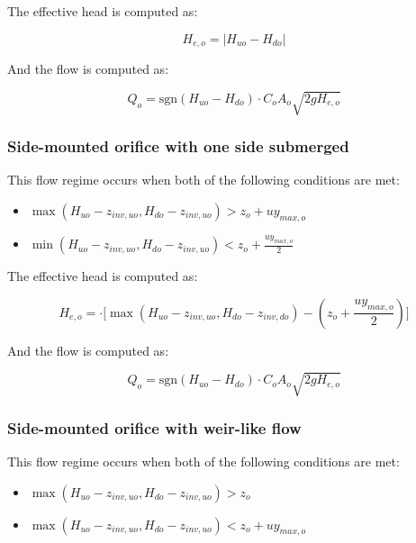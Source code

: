 \documentclass[11pt]{article}
\begin{document}
The effective head is computed as:

\begin{equation}
  H_{e,o} = | H_{uo} - H_{do} |
\end{equation}

And the flow is computed as:

\begin{equation}
 Q_o = \text{sgn}(H_{uo} - H_{do}) \cdot C_o A_o \sqrt{2 g H_{e,o}} 
\end{equation}

\subsubsection*{Side-mounted orifice with one side submerged}

This flow regime occurs when both of the following conditions are met:

\begin{itemize}
\item $\max(H_{uo} - z_{inv,uo}, H_{do} - z_{inv,uo}) > z_o + u y_{max,o}$
\item $\min(H_{uo} - z_{inv,uo}, H_{do} - z_{inv,uo}) < z_o + \frac{u y_{max,o}}{2}$
\end{itemize}

The effective head is computed as:

\begin{equation}
  H_{e,o} = \cdot \bigl[ \max(H_{uo} - z_{inv,uo}, H_{do} - z_{inv,do}) - (z_o + \frac{u y_{max,o}}{2}) \bigr]
\end{equation}

And the flow is computed as:

\begin{equation}
 Q_o = \text{sgn}(H_{uo} - H_{do}) \cdot C_o A_o \sqrt{2 g H_{e,o}} 
\end{equation}

\subsubsection*{Side-mounted orifice with weir-like flow}

This flow regime occurs when both of the following conditions are met:

\begin{itemize}
\item $\max(H_{uo} - z_{inv,uo}, H_{do} - z_{inv,uo}) > z_o$
\item $\max(H_{uo} - z_{inv,uo}, H_{do} - z_{inv,uo}) < z_o + u y_{max,o}$
\end{itemize}
\end{document}
